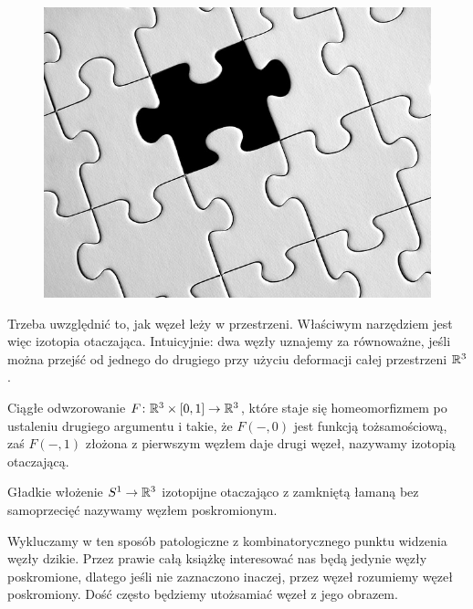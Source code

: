 \begin{figure}[H]
\begin{minipage}[b]{.23\linewidth}
	\end{minipage}
	\begin{minipage}[b]{.23\linewidth}
		\centering
		\includegraphics[width=\linewidth]{../data/missing.jpg}
	\end{minipage}
\end{figure}

Trzeba uwzględnić to, jak węzeł leży w przestrzeni.
Właściwym narzędziem jest więc izotopia otaczająca.
Intuicyjnie: dwa węzły uznajemy za równoważne,
jeśli można przejść od jednego do drugiego przy użyciu deformacji całej przestrzeni $\mathbb R^3$.

\begin{definition} \label{def_ambient_isotopy}
	Ciągłe odwzorowanie $F \colon \mathbb R^3 \times [0,1] \to \mathbb R^3$,
	które staje się homeomorfizmem po ustaleniu drugiego argumentu i takie,
	że $F(-, 0)$ jest funkcją tożsamościową,
	zaś $F(-, 1)$ złożona z pierwszym węzłem daje drugi węzeł,
	nazywamy izotopią otaczającą.
\end{definition}

\begin{definition}[węzeł] \label{def:knot}
	Gładkie włożenie $S^1 \to \mathbb R^3$ izotopijne otaczająco z zamkniętą łamaną bez samoprzecięć nazywamy węzłem poskromionym.
\end{definition}

Wykluczamy w ten sposób patologiczne z kombinatorycznego punktu widzenia węzły dzikie.
Przez prawie całą książkę interesować nas będą jedynie węzły poskromione,
dlatego jeśli nie zaznaczono inaczej, przez węzeł rozumiemy węzeł poskromiony.
Dość często będziemy utożsamiać węzeł z jego obrazem.


